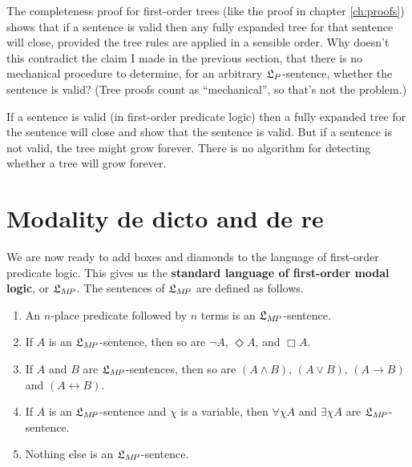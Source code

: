\begin{exercise}
  The completeness proof for first-order trees (like the proof in chapter
  \ref{ch:proofs}) shows that if a sentence is valid then any fully expanded
  tree for that sentence will close, provided the tree rules are applied in a
  sensible order. Why doesn't this contradict the claim I made in the previous
  section, that there is no mechanical procedure to determine, for an arbitrary
  $\mathfrak{L}_P$-sentence, whether the sentence is valid? (Tree proofs count as
  ``mechanical'', so that's not the problem.)
\end{exercise}
\begin{solution}
  If a sentence is valid (in first-order predicate logic) then a fully expanded
  tree for the sentence will close and show that the sentence is valid. But if a
  sentence is not valid, the tree might grow forever. There is no algorithm for
  detecting whether a tree will grow forever. 
\end{solution}


\section{Modality de dicto and de re}


We are now ready to add boxes and diamonds to the language of first-order
predicate logic. This gives us the \textbf{standard language of first-order
  modal logic}, or $\mathfrak{L}_{M\!P}$. The sentences of $\mathfrak{L}_{M\!P}$ are defined as
follows.
%
\begin{enumerate}[leftmargin=9mm]
  \itemsep-1mm
  \item An $n$-place predicate followed by $n$ terms is an $\mathfrak{L}_{M\!P}$-sentence.
  \item If $A$ is an $\mathfrak{L}_{M\!P}$-sentence, then so are $\neg A$, $\Diamond A$,
        and $\Box A$.
  \item If $A$ and $B$ are $\mathfrak{L}_{M\!P}$-sentences, then so are $(A \land B)$,
        $(A \lor B)$, $(A \to B)$ and $(A \leftrightarrow B)$.
  \item If $A$ is an $\mathfrak{L}_{M\!P}$-sentence and $\chi$ is a variable, then
        $\forall \chi A$ and $\exists \chi A$ are $\mathfrak{L}_{M\!P}$-sentence.
  \item Nothing else is an $\mathfrak{L}_{M\!P}$-sentence.
\end{enumerate}

